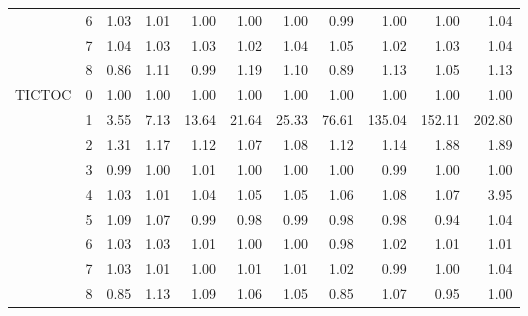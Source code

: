 \begin{tabular}{llrrrrrrrrr}
       & 6 &  1.03 &  1.01 &  1.00 &  1.00 &  1.00 &   0.99 &   1.00 &   1.00 &   1.04 \\
       & 7 &  1.04 &  1.03 &  1.03 &  1.02 &  1.04 &   1.05 &   1.02 &   1.03 &   1.04 \\
       & 8 &  0.86 &  1.11 &  0.99 &  1.19 &  1.10 &   0.89 &   1.13 &   1.05 &   1.13 \\
TICTOC & 0 &  1.00 &  1.00 &  1.00 &  1.00 &  1.00 &   1.00 &   1.00 &   1.00 &   1.00 \\
       & 1 &  3.55 &  7.13 & 13.64 & 21.64 & 25.33 &  76.61 & 135.04 & 152.11 & 202.80 \\
       & 2 &  1.31 &  1.17 &  1.12 &  1.07 &  1.08 &   1.12 &   1.14 &   1.88 &   1.89 \\
       & 3 &  0.99 &  1.00 &  1.01 &  1.00 &  1.00 &   1.00 &   0.99 &   1.00 &   1.00 \\
       & 4 &  1.03 &  1.01 &  1.04 &  1.05 &  1.05 &   1.06 &   1.08 &   1.07 &   3.95 \\
       & 5 &  1.09 &  1.07 &  0.99 &  0.98 &  0.99 &   0.98 &   0.98 &   0.94 &   1.04 \\
       & 6 &  1.03 &  1.03 &  1.01 &  1.00 &  1.00 &   0.98 &   1.02 &   1.01 &   1.01 \\
       & 7 &  1.03 &  1.01 &  1.00 &  1.01 &  1.01 &   1.02 &   0.99 &   1.00 &   1.04 \\
       & 8 &  0.85 &  1.13 &  1.09 &  1.06 &  1.05 &   0.85 &   1.07 &   0.95 &   1.00 \\
\bottomrule
\end{tabular}
